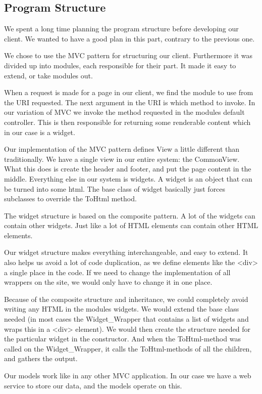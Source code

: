 \subsection{Program Structure}
We spent a long time planning the program structure before developing our client. We wanted to have a good plan in this part, contrary to the previous one.

We chose to use the MVC pattern for structuring our client. Furthermore it was divided up into modules, each responsible for their part. It made it easy to extend, or take modules out.

When a request is made for a page in our client, we find the module to use from the URI requested. The next argument in the URI is which method to invoke. In our variation of MVC we invoke the method requested in the modules default controller. This is then responsible for returning some renderable content which in our case is a widget.

Our implementation of the MVC pattern defines View a little different than traditionally. We have a single view in our entire system: the CommonView. What this does is create the header and footer, and put the page content in the middle. Everything else in our system is widgets. A widget is an object that can be turned into some html. The base class of widget basically just forces subclasses to override the ToHtml method.

The widget structure is based on the composite pattern. A lot of the widgets can contain other widgets. Just like a lot of HTML elements can contain other HTML elements.

Our widget structure makes everything interchangeable, and easy to extend. It also helps us avoid a lot of code duplication, as we define elements like the <div> a single place in the code. If we need to change the implementation of all wrappers on the site, we would only have to change it in one place.

Because of the composite structure and inheritance, we could completely avoid writing any HTML in the modules widgets. We would extend the base class needed (in most cases the Widget\_Wrapper that contains a list of widgets and wraps this in a <div> element). We would then create the structure needed for the particular widget in the constructor. And when the ToHtml-method was called on the Widget\_Wrapper, it calls the ToHtml-methods of all the children, and gathers the output. 

Our models work like in any other MVC application. In our case we have a web service to store our data, and the models operate on this.
\newpage
